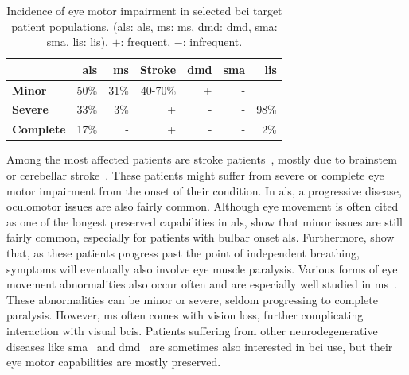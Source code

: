 \begin{table}[h]
  \sffamily
  \footnotesize
	\centering
	\begin{tabular}{@{}l|rrrrr|r@{}}
    & \bfseries \acs{als} & \bfseries \acs{ms}   & \bfseries Stroke &\bfseries\acs{dmd} &\bfseries \acs{sma} &\bfseries \acs{lis} \\ \hline
		\bfseries Minor    & 50\% & 31\% & 40-70\% & + & - &      \\
		\bfseries Severe   & 33\% & 3\%  & +       & - & - & 98\% \\
		\bfseries Complete & 17\% & -    & +       & - & - & 2\%  \\
	\end{tabular}
	\caption{Incidence of eye motor impairment in selected \ac{bci} target
    patient populations. (\acs{als}: \acl{als}, \acs{ms}: \acl{ms}, \acs{dmd}:
    \acl{dmd}, \acs{sma}: \acl{sma}, \acs{lis}: \acl{lis}).
    $+$: frequent, $-$: infrequent.}
    \label{tab:incidence}
\end{table}

Among the most affected patients are stroke patients~\cite{Pollock2011}, mostly
due to brainstem or cerebellar stroke~\cite{Moncayo2009,Bogousslavsky1987}.
These patients might suffer from severe or complete eye motor impairment
from the onset of their condition.
In \ac{als}, a progressive disease, oculomotor issues are also fairly common.
Although eye movement is often cited as one of the longest preserved
capabilities in \ac{als}, \textcite{Guo2022} show that minor issues are still
fairly common,
especially for patients with bulbar onset \ac{als}.
Furthermore, \textcite{Hayashi1991} show that, as these patients progress past
the point of independent breathing, symptoms will eventually also involve
eye muscle paralysis.
Various forms of eye movement abnormalities also occur often and are especially well studied in
\ac{ms}~\cite{Mueri1985,Prasad2010,Castelnovo2016,Serra2018,Polet2020}.
These abnormalities can be minor or severe, seldom progressing to complete
paralysis.
However, \ac{ms} often comes with vision loss, further complicating interaction
with visual \acp{bci}.
Patients suffering from other neurodegenerative diseases like
\ac{sma}~\cite{Anagnostou2021} and \ac{dmd}~\cite{Lui2001} are
sometimes also interested in \ac{bci} use, but their eye motor capabilities are
mostly preserved.


